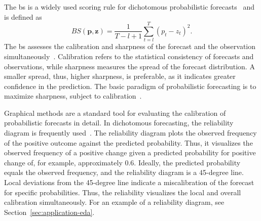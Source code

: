 The \ac{bs} is a widely used scoring rule for dichotomous probabilistic forecasts~\parencite{Brier1950} and is defined as
\begin{equation*}
    BS (\mathbf{p}, \mathbf{z}) = \frac{1}{T-l+1} \sum_{t=l}^{T} (p_t - z_t)^2.
\end{equation*}
The \ac{bs} assesses the calibration and sharpness of the forecast and the observation simultaneously~\parencite{Ranjan2010,Mitchell2011}.
Calibration refers to the statistical consistency of forecasts and observations, while sharpness measures the spread of the forecast distribution.
A smaller spread, thus, higher sharpness, is preferable, as it indicates greater confidence in the prediction.
The basic paradigm of probabilistic forecasting is to maximize sharpness, subject to calibration~\parencite{Gneiting2014}.

Graphical methods are a standard tool for evaluating the calibration of probabilistic forecasts in detail.
In dichotomous forecasting, the reliability diagram is frequently used~\parencite{Ranjan2010}.
The reliability diagram plots the observed frequency of the positive outcome against the predicted probability.
Thus, it visualizes the observed frequency of a positive change given a predicted probability for positive change of, for example, approximately 0.6.
Ideally, the predicted probability equals the observed frequency, and the reliability diagram is a 45-degree line.
Local deviations from the 45-degree line indicate a miscalibration of the forecast for specific probabilities.
Thus, the reliability visualizes the local and overall calibration simultaneously.
For an example of a reliability diagram, see Section~\ref{sec:application-eda}.

